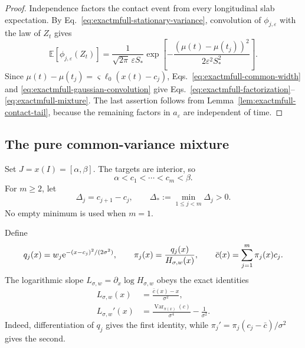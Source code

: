 \begin{proof}
Independence factors the contact event from every longitudinal slab
expectation.  By Eq.~\eqref{eq:exactmfull-stationary-variance}, convolution
of \(\phi_{j,\varepsilon}\) with the law of \(Z_t\) gives
\begin{equation}
 \mathbb E[\phi_{j,\varepsilon}(Z_t)]
 =\frac{1}{\sqrt{2\pi}\,\varepsilon S_*}
 \exp\!\left[-\frac{(\mu(t)-\mu(t_j))^2}
 {2\varepsilon^2S_*^2}\right].
 \label{eq:exactmfull-gaussian-convolution}
\end{equation}
Since
\(\mu(t)-\mu(t_j)=\varsigma\ell_0(x(t)-c_j)\),
Eqs.~\eqref{eq:exactmfull-common-width} and
\eqref{eq:exactmfull-gaussian-convolution} give
Eqs.~\eqref{eq:exactmfull-factorization}--
\eqref{eq:exactmfull-mixture}.  The last assertion follows from
Lemma~\ref{lem:exactmfull-contact-tail}, because the remaining factors in
\(a_\varepsilon\) are independent of time.
\end{proof}

\subsection{The pure common-variance mixture}
\label{subsec:exactmfull-pure-mixture}

Set \(J=x(I)=[\alpha,\beta]\).  The targets are interior, so
\begin{equation}
 \alpha<c_1<\cdots<c_m<\beta.
 \label{eq:exactmfull-centre-order}
\end{equation}
For \(m\ge2\), let
\begin{equation}
 \Delta_j=c_{j+1}-c_j,
 \qquad \Delta_*:=\min_{1\le j<m}\Delta_j>0.
 \label{eq:exactmfull-gaps}
\end{equation}
No empty minimum is used when \(m=1\).

Define
\begin{equation}
 q_j(x)=w_j\mathrm e^{-(x-c_j)^2/(2\sigma^2)},
 \qquad
 \pi_j(x)=\frac{q_j(x)}{H_{\sigma,w}(x)},
 \qquad
 \bar c(x)=\sum_{j=1}^m\pi_j(x)c_j.
 \label{eq:exactmfull-posterior}
\end{equation}
The logarithmic slope \(L_{\sigma,w}=\partial_x\log H_{\sigma,w}\) obeys
the exact identities
\begin{align}
 L_{\sigma,w}(x)
 &=\frac{\bar c(x)-x}{\sigma^2},
 \label{eq:exactmfull-log-slope}\\
 L_{\sigma,w}'(x)
 &=\frac{\operatorname{Var}_{\pi(x)}(c)}{\sigma^4}
   -\frac{1}{\sigma^2}.
 \label{eq:exactmfull-log-slope-derivative}
\end{align}
Indeed, differentiation of \(q_j\) gives the first identity, while
\(\pi_j'=\pi_j(c_j-\bar c)/\sigma^2\) gives the second.

